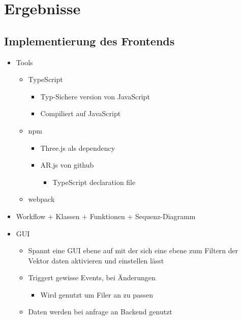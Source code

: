 \section{Ergebnisse}


\subsection{Implementierung des Frontends}

\begin{itemize}
	\item Tools
	\begin{itemize}
	
		\item TypeScript
		\begin{itemize}
			\item Typ-Sichere version von JavaScript
			\item Compiliert auf JavaScript
		\end{itemize}
		
		\item npm
		\begin{itemize}
			\item Three.js als dependency
			\item AR.js von github
			\begin{itemize}
				\item TypeScript declaration file
			\end{itemize}
		\end{itemize}
		
		\item webpack
	\end{itemize}
	
	\item Workflow + Klassen + Funktionen + Sequenz-Diagramm
	
	\item GUI
	\begin{itemize}
		\item Spannt eine GUI ebene auf mit der sich eine ebene zum Filtern der Vektor daten aktivieren und einstellen lässt
		\item Triggert gewisse Events, bei Änderungen
		\begin{itemize}
			\item Wird genutzt um Filer an zu passen
		\end{itemize}
		\item Daten werden bei anfrage an Backend genutzt
	\end{itemize}
\end{itemize}



